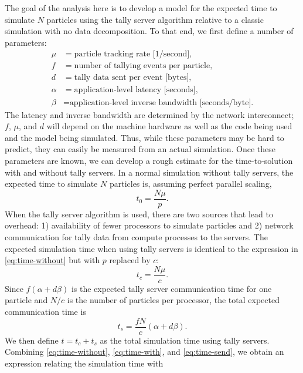 \documentclass{snamc2013}
\begin{document}
The goal of the analysis here is to develop a model for the expected time to
simulate $N$ particles using the tally server algorithm relative to a classic
simulation with no data decomposition. To that end, we first define a number of
parameters:
\begin{align*}
  \mu &= \text{particle tracking rate [1/second]}, \\
  f &= \text{number of tallying events per particle}, \\
  d &= \text{tally data sent per event [bytes]}, \\
  \alpha &= \text{application-level latency [seconds]}, \\
  \beta &= \text{application-level inverse bandwidth [seconds/byte].}
\end{align*}
The latency and inverse bandwidth are determined by the network interconnect;
$f$, $\mu$, and $d$ will depend on the machine hardware as well as the code
being used and the model being simulated. Thus, while these parameters may be
hard to predict, they can easily be measured from an actual simulation. Once
these parameters are known, we can develop a rough estimate for the
time-to-solution with and without tally servers. In a normal simulation without
tally servers, the expected time to simulate $N$ particles is, assuming perfect
parallel scaling,
\begin{equation}
  \label{eq:time-without}
  t_0 = \frac{N\mu}{p}.
\end{equation}
When the tally server algorithm is used, there are two sources that lead to
overhead: 1) availability of fewer processors to simulate particles and 2)
network communication for tally data from compute processes to the servers. The
expected simulation time when using tally servers is identical to the expression
in \autoref{eq:time-without} but with $p$ replaced by $c$:
\begin{equation}
  \label{eq:time-with}
  t_c = \frac{N\mu}{c}.
\end{equation}
Since $f(\alpha + d \beta)$ is the expected tally server communication time for
one particle and $N/c$ is the number of particles per processor, the total
expected communication time is
\begin{equation}
  \label{eq:time-send}
  t_s = \frac{fN}{c} \left ( \alpha + d\beta \right ).
\end{equation}
We then define $t = t_c + t_s$ as the total simulation time using tally
servers. Combining \autoref{eq:time-without}, \autoref{eq:time-with}, and
\autoref{eq:time-send}, we obtain an expression relating the simulation time with
\end{document}
